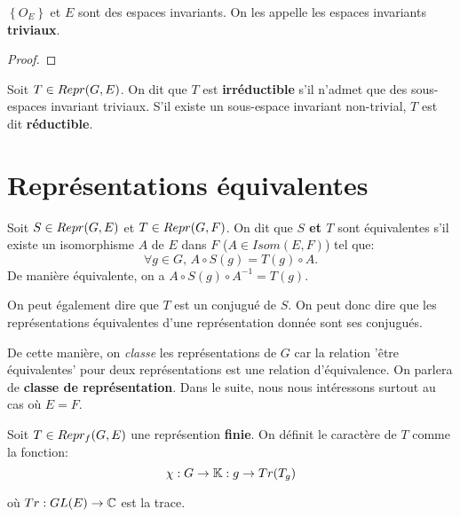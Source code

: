 \begin{proposition}
	$\left\{ O_{E} \right\}$ et $E$ sont des espaces invariants. On les appelle
	les espaces invariants \textbf{triviaux}.
\end{proposition}

\begin{proof}
	
\end{proof}

\begin{definition} 
	Soit $T \in Repr(G, E)$. On dit que $T$ est \textbf{irréductible} s'il
	n'admet que des sous-espaces invariant triviaux. S'il existe un sous-espace
	invariant non-trivial, $T$ est dit \textbf{réductible}.
\end{definition}

\section{Représentations équivalentes}

\begin{definition}
	Soit $S \in Repr(G, E)$ et $T \in Repr(G, F)$.
	On dit que \textbf{$S$ et $T$} sont équivalentes s'il existe un isomorphisme
	$A$ de $E$ dans $F$ ($A \in Isom(E, F)$) tel que:
	\begin{equation}
		\forall g \in G, \, A \circ S(g) = T(g) \circ A.
	\end{equation}
	De manière équivalente, on a $A \circ S(g) \circ A^{-1} = T(g)$.
	
	On peut également dire que $T$ est un conjugué de $S$. On peut donc dire que
	les représentations équivalentes d'une représentation donnée sont ses
	conjugués.
\end{definition}

De cette manière, on \textit{classe} les représentations de $G$ car la
relation 'être équivalentes' pour deux représentations est une relation
d'équivalence. On parlera de \textbf{classe de représentation}.
Dans le suite, nous nous intéressons surtout au cas où $E = F$.

\begin{definition}
	Soit $T \in Repr_{f}(G, E)$ une représention \textbf{finie}.
	On définit le caractère de $T$ comme la fonction:
	\begin{equation}
		\chi : G \rightarrow \mathbb{K} : g \rightarrow Tr(T_{g})
	\end{equation}

	où $Tr : GL(E) \rightarrow \mathbb{C}$ est la trace.
\end{definition}

